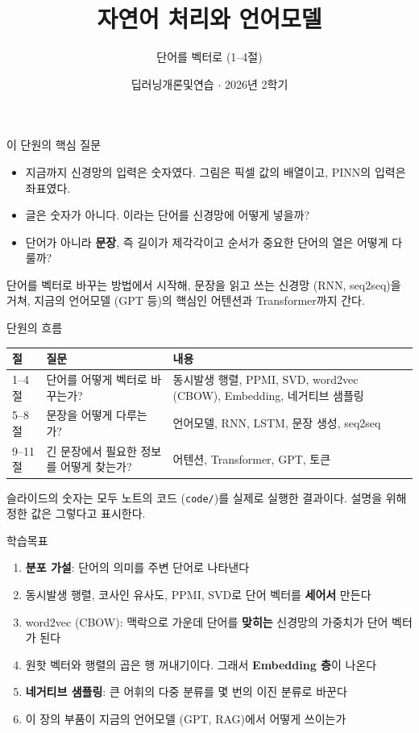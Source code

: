 \documentclass[aspectratio=169,11pt]{beamer}
\title[자연어 처리와 언어모델]{자연어 처리와 언어모델}
\subtitle{단어를 벡터로 (1--4절)}
\date{딥러닝개론및연습 $\cdot$ 2026년 2학기}
\begin{document}
\begin{frame}[plain]
\titlepage
\end{frame}

\begin{frame}{이 단원의 핵심 질문}
\begin{keybox}[이 단원의 핵심 질문]
\begin{itemize}
\item 지금까지 신경망의 입력은 숫자였다. 그림은 픽셀 값의 배열이고, PINN의 입력은 좌표였다.
\item 글은 숫자가 아니다. 이라는 단어를 신경망에 어떻게 넣을까?
\item 단어가 아니라 \textbf{문장}, 즉 길이가 제각각이고 순서가 중요한 단어의 열은 어떻게 다룰까?
\end{itemize}
\end{keybox}
\vskip2mm
단어를 벡터로 바꾸는 방법에서 시작해, 문장을 읽고 쓰는 신경망 (RNN, seq2seq)을 거쳐,
지금의 언어모델 (GPT 등)의 핵심인 어텐션과 Transformer까지 간다.
\end{frame}

\begin{frame}{단원의 흐름}
\centering
\small
\begin{tabular}{@{}lp{54mm}p{66mm}@{}}
\toprule
절 & 질문 & 내용 \\
\midrule
\rowcolor{softblue}
1--4절 & 단어를 어떻게 벡터로 바꾸는가? & 동시발생 행렬, PPMI, SVD, word2vec (CBOW), Embedding, 네거티브 샘플링 \\
5--8절 & 문장을 어떻게 다루는가? & 언어모델, RNN, LSTM, 문장 생성, seq2seq \\
9--11절 & 긴 문장에서 필요한 정보를 어떻게 찾는가? & 어텐션, Transformer, GPT, 토큰 \\
\bottomrule
\end{tabular}
\vskip4mm
\raggedright
슬라이드의 숫자는 모두 노트의 코드 (\texttt{code/})를 실제로 실행한 결과이다.
설명을 위해 정한 값은 그렇다고 표시한다.
\end{frame}

\begin{frame}{학습목표}
\begin{enumerate}
\item \textbf{분포 가설}: 단어의 의미를 주변 단어로 나타낸다
\item 동시발생 행렬, 코사인 유사도, PPMI, SVD로 단어 벡터를 \textbf{세어서} 만든다
\item word2vec (CBOW): 맥락으로 가운데 단어를 \textbf{맞히는} 신경망의 가중치가 단어 벡터가 된다
\item 원핫 벡터와 행렬의 곱은 행 꺼내기이다. 그래서 \textbf{Embedding 층}이 나온다
\item \textbf{네거티브 샘플링}: 큰 어휘의 다중 분류를 몇 번의 이진 분류로 바꾼다
\item 이 장의 부품이 지금의 언어모델 (GPT, RAG)에서 어떻게 쓰이는가
\end{enumerate}
\end{frame}
\end{document}

